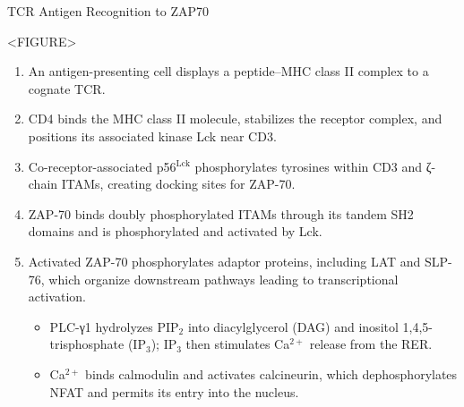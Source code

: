     \begin{core}{TCR Antigen Recognition to ZAP70}

      <FIGURE>

      \begin{enumerate}[label=(\arabic*)]

        \item An antigen-presenting cell displays a peptide--MHC class II complex to a cognate TCR.

        \item CD4 binds the MHC class II molecule, stabilizes the receptor complex, and positions its associated kinase Lck near CD3.

        \item Co-receptor-associated p56$^{\text{Lck}}$ phosphorylates tyrosines within CD3 and ζ-chain ITAMs, creating docking sites for ZAP-70.

        \item ZAP-70 binds doubly phosphorylated ITAMs through its tandem SH2 domains and is phosphorylated and activated by Lck.

        \item Activated ZAP-70 phosphorylates adaptor proteins, including LAT and SLP-76, which organize downstream pathways leading to transcriptional activation.

        \begin{itemize}

          \item PLC-γ1 hydrolyzes PIP$_2$ into diacylglycerol (DAG) and inositol 1,4,5-trisphosphate (IP$_3$); IP$_3$ then stimulates Ca$^{2+}$ release from the RER.

          \item Ca$^{2+}$ binds calmodulin and activates calcineurin, which dephosphorylates NFAT and permits its entry into the nucleus.


\end{itemize}
\end{enumerate}
\end{core}
